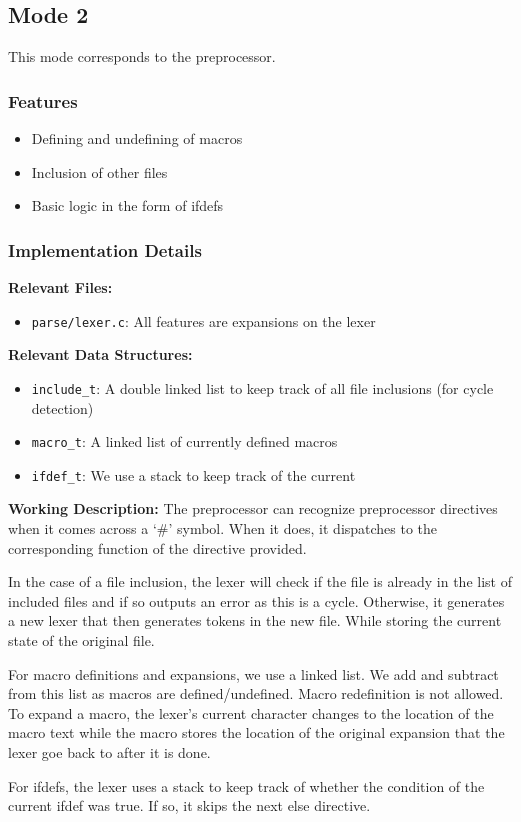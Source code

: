 \subsection{Mode 2}
\label{sec:mode-2}

This mode corresponds to the preprocessor.

\subsubsection{Features}

\begin{itemize}
    \item Defining and undefining of macros
    \item Inclusion of other files
    \item Basic logic in the form of ifdefs
\end{itemize}

\subsubsection{Implementation Details}

\textbf{Relevant Files:}

\begin{itemize}
    \item \verb|parse/lexer.c|: All features are expansions on the lexer
\end{itemize}

\noindent \textbf{Relevant Data Structures:}

\begin{itemize}
    \item \verb|include_t|: A double linked list to keep track of all file
    inclusions (for cycle detection)
    \item \verb|macro_t|: A linked list of currently defined macros
    \item \verb|ifdef_t|: We use a stack to keep track of the current 
\end{itemize}

\noindent \textbf{Working Description:} The preprocessor can recognize
preprocessor directives when it comes across a `\#' symbol. When it does, it
dispatches to the corresponding function of the directive provided. 

In the case of a file inclusion, the lexer will check if the file is already in
the list of included files and if so outputs an error as this is a cycle.
Otherwise, it generates a new lexer that then generates tokens in the new file.
While storing the current state of the original file.

For macro definitions and expansions, we use a linked list. We add and subtract
from this list as macros are defined/undefined. Macro redefinition is not
allowed. To expand a macro, the lexer's current character changes to the
location of the macro text while the macro stores the location of the original
expansion that the lexer goe back to after it is done.

For ifdefs, the lexer uses a stack to keep track of whether the condition of the
current ifdef was true. If so, it skips the next else directive. 
